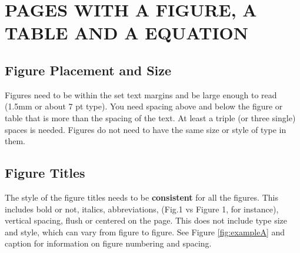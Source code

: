 \chapter{PAGES WITH A FIGURE, A TABLE AND A EQUATION}
\section{Figure Placement and Size}

Figures need to be within the set text margins and be large enough to read (1.5mm or about 7 pt type). You need spacing above and below the figure or table that is more than the spacing of the text. At least a triple (or three single) spaces is needed. Figures do not need to have the same size or style of type in them.

\section{Figure Titles}
The style of the figure titles needs to be \textbf{consistent} for all the figures. This includes bold or not, italics, abbreviations, (Fig.1 vs Figure 1, for instance), vertical spacing, flush or centered on the page. This does not include type size and style, which can vary from figure to figure. See Figure \ref{fig:exampleA} and %
caption for information on figure numbering and spacing.

